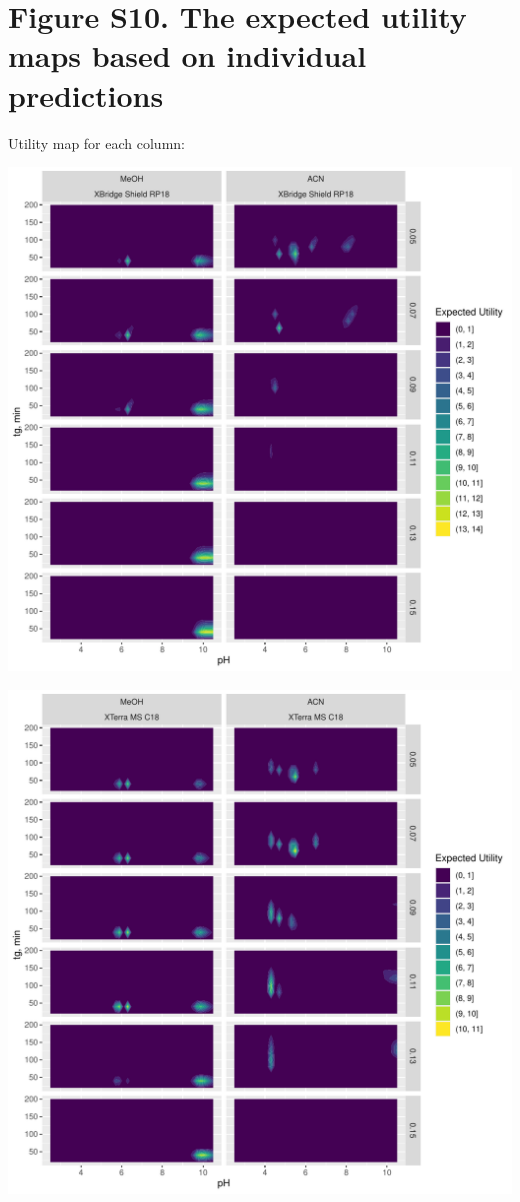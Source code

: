 \documentclass[
]{article}
\begin{document}
\newpage{}

\hypertarget{figure-s10.-the-expected-utility-maps-based-on-individual-predictions}{%
\section{Figure S10. The expected utility maps based on individual
predictions}\label{figure-s10.-the-expected-utility-maps-based-on-individual-predictions}}

Utility map for each column:

\includegraphics{../figures/casestudy1/utilitymap/utilitymap1.pdf}

\newpage{}

\includegraphics{../figures/casestudy1/utilitymap/utilitymap2.pdf}
\end{document}

